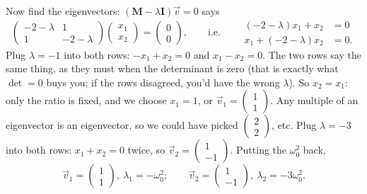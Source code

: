 \documentclass[12pt]{article}
\numberwithin{equation}{section}
\newcommand{\wo}{\omega_0}
\begin{document}
Now find the eigenvectors: $(\mathbf{M} - \lambda\mathbf{I})\vec{v} = 0$
says
\begin{equation}
  \label{eq:rows}
  \begin{pmatrix} -2-\lambda & 1 \\ 1 & -2-\lambda \end{pmatrix}
  \begin{pmatrix} x_1 \\ x_2 \end{pmatrix}
  = \begin{pmatrix} 0 \\ 0 \end{pmatrix},
  \qquad\textrm{i.e.}\qquad
  \begin{aligned}
    (-2-\lambda)x_1 + x_2 &= 0 \\
    x_1 + (-2-\lambda)x_2 &= 0 .
  \end{aligned}
\end{equation}
Plug $\lambda = -1$ into both rows: $-x_1 + x_2 = 0$ and $x_1 - x_2 = 0$.
The two rows say the same thing, as they must when the determinant is
zero (that is exactly what $\det = 0$ buys you; if the rows disagreed,
you'd have the wrong $\lambda$). So $x_2 = x_1$: only the ratio is fixed,
and we choose $x_1 = 1$, or $\vec{v}_1 = \left(\begin{smallmatrix} 1
\\ 1 \end{smallmatrix}\right)$. Any multiple of an eigenvector is an
eigenvector, so we could have picked $\left(\begin{smallmatrix} 2 \\ 2
\end{smallmatrix}\right)$, etc. Plug $\lambda = -3$ into both rows: $x_1 +
x_2 = 0$ twice, so $\vec{v}_2 = \left(\begin{smallmatrix} 1 \\ -1
\end{smallmatrix}\right)$. Putting the $\wo^2$ back,
\begin{equation}
  \label{eq:eigen}
  \boxed{\;\vec{v}_1 = \begin{pmatrix} 1 \\ 1 \end{pmatrix},\ \lambda_1 = -\wo^2;
  \qquad
  \vec{v}_2 = \begin{pmatrix} 1 \\ -1 \end{pmatrix},\ \lambda_2 = -3\wo^2.\;}
\end{equation}
\end{document}
